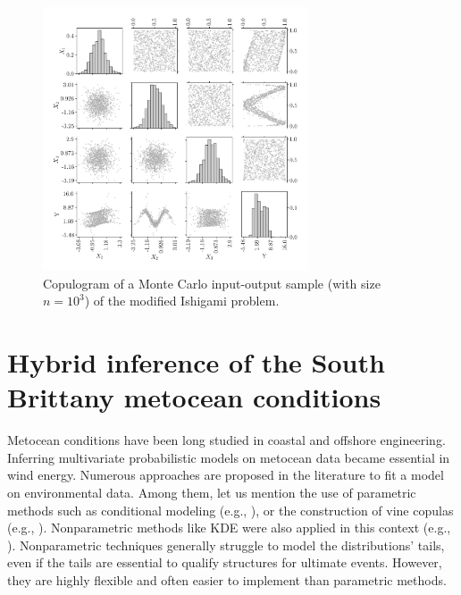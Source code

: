 \begin{figure}
    \centering
    \includegraphics[width=0.7\textwidth]{../numerical_experiments/chapter3/figures/ishigami_copluogram.png}
    \caption{Copulogram of a Monte Carlo input-output sample (with size $n=10^3$) of the modified Ishigami problem.}
    \label{fig:ishigami_copulogram}
\end{figure}



\section{Hybrid inference of the South Brittany metocean conditions} \label{sec:32_inference}
Metocean conditions have been long studied in coastal and offshore engineering. 
Inferring multivariate probabilistic models on metocean data became essential in wind energy. 
Numerous approaches are proposed in the literature to fit a model on environmental data. 
Among them, let us mention the use of parametric methods such as conditional modeling (e.g., \citealp{bitner_2015_joint,vanem_fekhari_2023}), or the construction of vine copulas (e.g., \citealp{vanem_2016,montes_2016_cvines_metocean,lin_2019_cvines_waves}). 
Nonparametric methods like KDE were also applied in this context (e.g., \citealp{han_2018_kde_metocean}). 
Nonparametric techniques generally struggle to model the distributions' tails, even if the tails are essential to qualify structures for ultimate events. 
However, they are highly flexible and often easier to implement than parametric methods.

